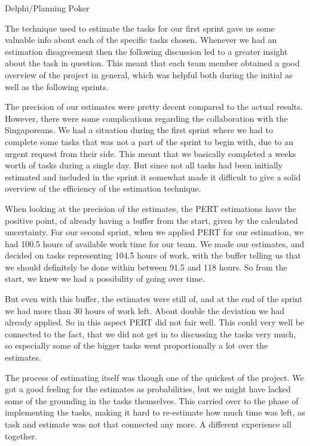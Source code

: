 Delphi/Planning Poker

The technique used to estimate the tasks for our first sprint gave us some valuable info about each of the specific tasks chosen. Whenever we had an estimation disagreement then the following discussion led to a greater insight about the task in question. This meant that each team member obtained a good overview of the project in general, which was helpful both during the initial as well as the following sprints.

The precision of our estimates were pretty decent compared to the actual results. However, there were some complications regarding the collaboration with the Singaporeans. We had a situation during the first sprint where we had to complete some tasks that was not a part of the sprint to begin with, due to an urgent request from their side. This meant that we basically completed a weeks worth of tasks during a single day. But since not all tasks had been initially estimated and included in the sprint it somewhat made it difficult to give a solid overview of the efficiency of the estimation technique. 



When looking at the precision of the estimates, the PERT estimations have the positive point, of already having a buffer from the start, given by the calculated uncertainty. For our second sprint, when we applied PERT for our estimation, we had 100.5 hours of available work time for our team. We made our estimates, and decided on tasks representing 104.5 hours of work, with the buffer telling us that we should definitely be done within between 91.5 and 118 hours. So from the start, we knew we had a possibility of going over time. \

But even with this buffer, the estimates were still of, and at the end of the sprint we had more than 30 hours of work left. About double the deviation we had already applied. So in this aspect PERT did not fair well. This could very well be connected to the fact, that we did not get in to discussing the tasks very much, so especially some of the bigger tasks went proportionally a lot over the estimates. \

The process of estimating itself was though one of the quickest of the project. We got a good feeling for the estimates as probabilities, but we might have lacked some of the grounding in the tasks themselves. This carried over to the phase of implementing the tasks, making it hard to re-estimate how much time was left, as task and estimate was not that connected any more. A different experience all together. \\

